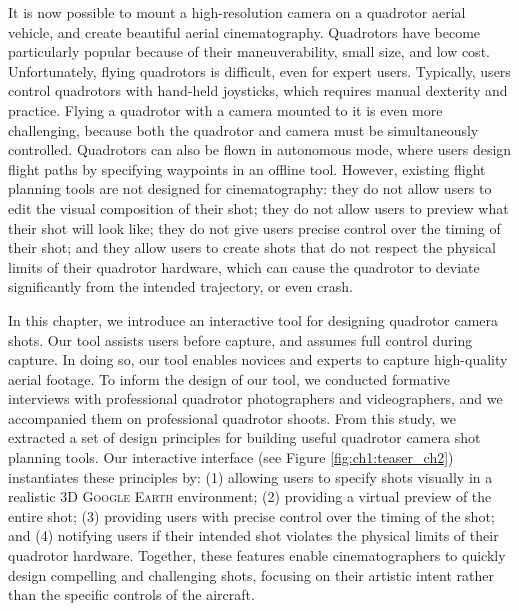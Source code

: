 
\label{sec:ch2}

It is now possible to mount a high-resolution camera on a quadrotor aerial vehicle, and create beautiful aerial cinematography.
Quadrotors have become particularly popular because of their maneuverability, small size, and low cost.
Unfortunately, flying quadrotors is difficult, even for expert users.
Typically, users control quadrotors with hand-held joysticks, which requires manual dexterity and practice.
Flying a quadrotor with a camera mounted to it is even more challenging, because both the quadrotor and camera must be simultaneously controlled. 
Quadrotors can also be flown in autonomous mode, where users design flight paths by specifying waypoints in an offline tool. 
However, existing flight planning tools are not designed for cinematography: they do not allow users to edit the visual composition of their shot; they do not allow users to preview what their shot will look like; they do not give users precise control over the timing of their shot; and they allow users to create shots that do not respect the physical limits of their quadrotor hardware, which can cause the quadrotor to deviate significantly from the intended trajectory, or even crash.

In this chapter, we introduce an interactive tool for designing quadrotor camera shots. Our tool assists users before capture, and assumes full control during capture.
In doing so, our tool enables novices and experts to capture high-quality aerial footage.
To inform the design of our tool, we conducted formative interviews with professional quadrotor photographers and videographers, and we accompanied them on professional quadrotor shoots.
From this study, we extracted a set of design principles for building useful quadrotor camera shot planning tools. 
Our interactive interface (see Figure \ref{fig:ch1:teaser_ch2}) instantiates these principles by: (1) allowing users to specify shots visually in a realistic 3D \textsc{Google Earth} environment; (2) providing a virtual preview of the entire shot; (3) providing users with precise control over the timing of the shot; and (4) notifying users if their intended shot violates the physical limits of their quadrotor hardware.
Together, these features enable cinematographers to quickly design compelling and challenging shots, focusing on their artistic intent rather than the specific controls of the aircraft. 

